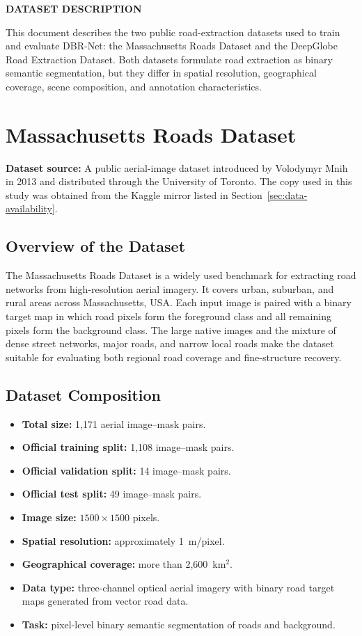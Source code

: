 \documentclass[11pt,a4paper]{article}
\begin{document}
\begin{center}
{\Large\bfseries DATASET DESCRIPTION}
\end{center}

This document describes the two public road-extraction datasets used to train
and evaluate DBR-Net: the Massachusetts Roads Dataset and the DeepGlobe Road
Extraction Dataset. Both datasets formulate road extraction as binary semantic
segmentation, but they differ in spatial resolution, geographical coverage,
scene composition, and annotation characteristics.

\section{Massachusetts Roads Dataset}

\textbf{Dataset source:} A public aerial-image dataset introduced by Volodymyr
Mnih in 2013 and distributed through the University of Toronto. The copy used
in this study was obtained from the Kaggle mirror listed in Section~\ref{sec:data-availability}.

\subsection{Overview of the Dataset}

The Massachusetts Roads Dataset is a widely used benchmark for extracting road
networks from high-resolution aerial imagery. It covers urban, suburban, and
rural areas across Massachusetts, USA. Each input image is paired with a binary
target map in which road pixels form the foreground class and all remaining
pixels form the background class. The large native images and the mixture of
dense street networks, major roads, and narrow local roads make the dataset
suitable for evaluating both regional road coverage and fine-structure recovery.

\subsection{Dataset Composition}

\begin{itemize}
  \item \textbf{Total size:} 1,171 aerial image--mask pairs.
  \item \textbf{Official training split:} 1,108 image--mask pairs.
  \item \textbf{Official validation split:} 14 image--mask pairs.
  \item \textbf{Official test split:} 49 image--mask pairs.
  \item \textbf{Image size:} $1500\times1500$ pixels.
  \item \textbf{Spatial resolution:} approximately 1~m/pixel.
  \item \textbf{Geographical coverage:} more than 2,600~km$^2$.
  \item \textbf{Data type:} three-channel optical aerial imagery with binary
        road target maps generated from vector road data.
  \item \textbf{Task:} pixel-level binary semantic segmentation of roads and
        background.
\end{itemize}
\end{document}
